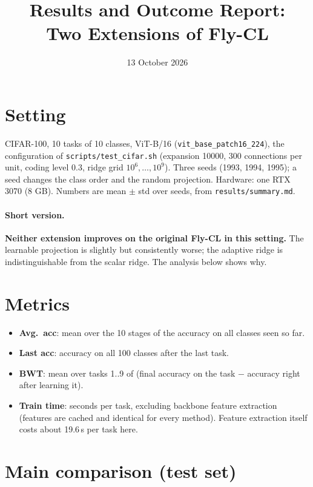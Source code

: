 \documentclass[11pt,a4paper]{article}
\title{Results and Outcome Report:\\ Two Extensions of Fly-CL}
\author{}
\date{13 October 2026}
\begin{document}
\maketitle

\section{Setting}

CIFAR-100, 10 tasks of 10 classes, ViT-B/16 (\texttt{vit\_base\_patch16\_224}), the configuration
of \texttt{scripts/test\_cifar.sh} (expansion 10000, 300 connections per unit, coding level 0.3,
ridge grid $10^6,\dots,10^9$). Three seeds (1993, 1994, 1995); a seed changes the class order and
the random projection. Hardware: one RTX 3070 (8 GB). Numbers are mean $\pm$ std over seeds, from
\texttt{results/summary.md}.

\paragraph{Short version.} \textbf{Neither extension improves on the original Fly-CL in this
setting.} The learnable projection is slightly but consistently worse; the adaptive ridge is
indistinguishable from the scalar ridge. The analysis below shows why.

\section{Metrics}

\begin{itemize}
  \item \textbf{Avg.\ acc}: mean over the 10 stages of the accuracy on all classes seen so far.
  \item \textbf{Last acc}: accuracy on all 100 classes after the last task.
  \item \textbf{BWT}: mean over tasks 1..9 of (final accuracy on the task $-$ accuracy right after learning it).
  \item \textbf{Train time}: seconds per task, excluding backbone feature extraction (features are
        cached and identical for every method). Feature extraction itself costs about 19.6\,s per task here.
\end{itemize}

\section{Main comparison (test set)}
\end{document}
